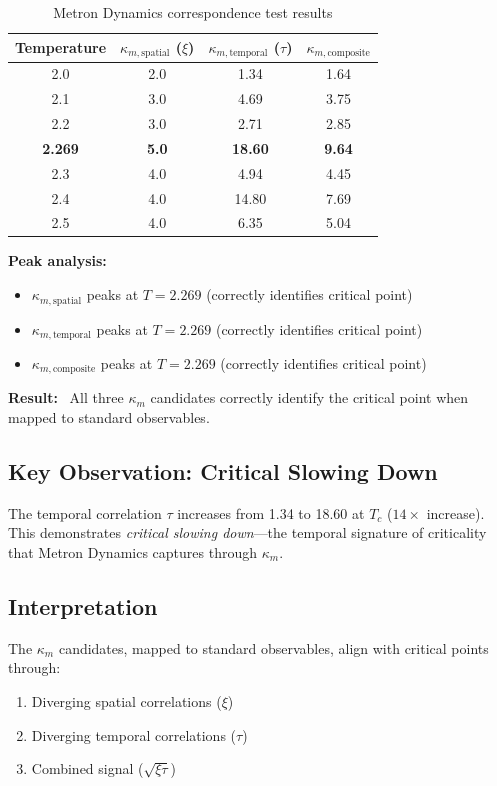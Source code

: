 \documentclass[11pt]{article}
\begin{document}
\begin{table}[h]
\centering
\caption{Metron Dynamics correspondence test results}
\begin{tabular}{cccc}
\toprule
\textbf{Temperature} & $\kappa_{m,\text{spatial}}$ ($\xi$) & $\kappa_{m,\text{temporal}}$ ($\tau$) & $\kappa_{m,\text{composite}}$ \\
\midrule
2.0 & 2.0 & 1.34 & 1.64 \\
2.1 & 3.0 & 4.69 & 3.75 \\
2.2 & 3.0 & 2.71 & 2.85 \\
\textbf{2.269} & \textbf{5.0} & \textbf{18.60} & \textbf{9.64} \\
2.3 & 4.0 & 4.94 & 4.45 \\
2.4 & 4.0 & 14.80 & 7.69 \\
2.5 & 4.0 & 6.35 & 5.04 \\
\bottomrule
\end{tabular}
\end{table}

\textbf{Peak analysis:}
\begin{itemize}
    \item $\kappa_{m,\text{spatial}}$ peaks at $T = 2.269$ (correctly identifies critical point)
    \item $\kappa_{m,\text{temporal}}$ peaks at $T = 2.269$ (correctly identifies critical point)
    \item $\kappa_{m,\text{composite}}$ peaks at $T = 2.269$ (correctly identifies critical point)
\end{itemize}

\textbf{Result:} \checkmark\ All three $\kappa_m$ candidates correctly identify the critical point when mapped to standard observables.

\subsection{Key Observation: Critical Slowing Down}

The temporal correlation $\tau$ increases from 1.34 to 18.60 at $T_c$ ($14\times$ increase). This demonstrates \textit{critical slowing down}---the temporal signature of criticality that Metron Dynamics captures through $\kappa_m$.

\subsection{Interpretation}

The $\kappa_m$ candidates, mapped to standard observables, align with critical points through:
\begin{enumerate}
    \item Diverging spatial correlations ($\xi$)
    \item Diverging temporal correlations ($\tau$)
    \item Combined signal ($\sqrt{\xi\tau}$)
\end{enumerate}
\end{document}
